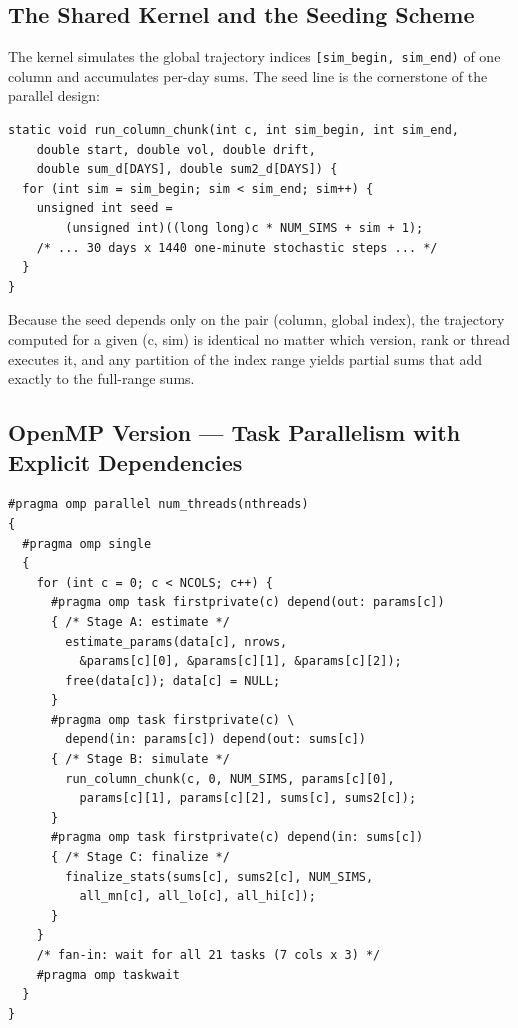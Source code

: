 \documentclass[12pt,a4paper]{article}
\begin{document}
\subsection{The Shared Kernel and the Seeding Scheme}

The kernel simulates the global trajectory indices \texttt{[sim\_begin, sim\_end)} of one
column and accumulates per-day sums. The seed line is the cornerstone of
the parallel design:

\begin{verbatim}
static void run_column_chunk(int c, int sim_begin, int sim_end,
    double start, double vol, double drift,
    double sum_d[DAYS], double sum2_d[DAYS]) {
  for (int sim = sim_begin; sim < sim_end; sim++) {
    unsigned int seed =
        (unsigned int)((long long)c * NUM_SIMS + sim + 1);
    /* ... 30 days x 1440 one-minute stochastic steps ... */
  }
}
\end{verbatim}

Because the seed depends only on the pair (column, global index), the
trajectory computed for a given (c, sim) is identical no matter which
version, rank or thread executes it, and any partition of the index
range yields partial sums that add exactly to the full-range sums.

\subsection{OpenMP Version --- Task Parallelism with Explicit Dependencies}

\begin{verbatim}
#pragma omp parallel num_threads(nthreads)
{
  #pragma omp single
  {
    for (int c = 0; c < NCOLS; c++) {
      #pragma omp task firstprivate(c) depend(out: params[c])
      { /* Stage A: estimate */
        estimate_params(data[c], nrows,
          &params[c][0], &params[c][1], &params[c][2]);
        free(data[c]); data[c] = NULL;
      }
      #pragma omp task firstprivate(c) \
        depend(in: params[c]) depend(out: sums[c])
      { /* Stage B: simulate */
        run_column_chunk(c, 0, NUM_SIMS, params[c][0],
          params[c][1], params[c][2], sums[c], sums2[c]);
      }
      #pragma omp task firstprivate(c) depend(in: sums[c])
      { /* Stage C: finalize */
        finalize_stats(sums[c], sums2[c], NUM_SIMS,
          all_mn[c], all_lo[c], all_hi[c]);
      }
    }
    /* fan-in: wait for all 21 tasks (7 cols x 3) */
    #pragma omp taskwait
  }
}
\end{verbatim}
\end{document}
